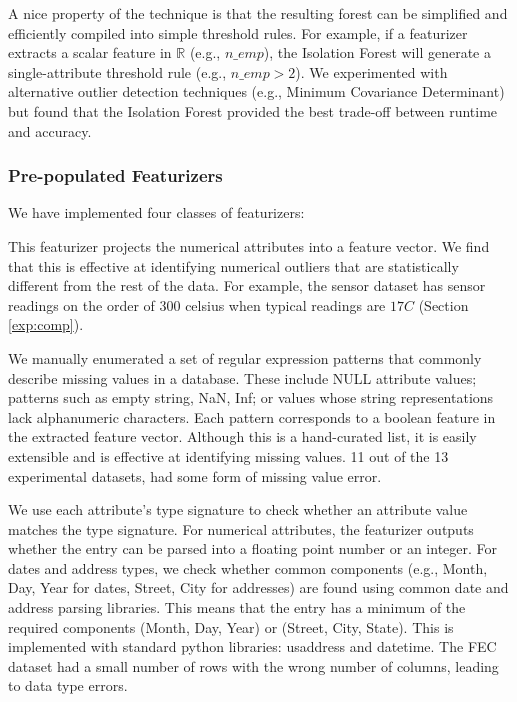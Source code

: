 A nice property of the technique is that the resulting forest can be simplified and efficiently compiled into simple threshold rules. 
For example, if a featurizer extracts a scalar feature in $\mathbb{R}$ (e.g., $n\_emp$), the Isolation Forest will generate a single-attribute threshold rule (e.g., $n\_emp > 2$).  
 We experimented with alternative outlier detection techniques (e.g., Minimum Covariance Determinant) but found that the Isolation Forest provided the best trade-off between runtime and accuracy.

\subsubsection{Pre-populated Featurizers}

We have implemented four classes of featurizers:


 This featurizer projects the numerical attributes into a feature vector.  We find that this is effective at identifying numerical outliers that are statistically different from the rest of the data. For example, the sensor dataset has sensor readings on the order of $300$ celsius when typical readings are $17C$ (Section \ref{exp:comp}).

  We manually enumerated a set of regular expression patterns that commonly describe missing values in a database.  These include \textsf{NULL} attribute values; patterns such as empty string, NaN, Inf; or values whose string representations lack alphanumeric characters. Each pattern corresponds to a boolean feature in the extracted feature vector.   Although this is a hand-curated list, it is easily extensible and is effective at identifying missing values. 11 out of the 13 experimental datasets, had some form of missing value error.

 We use each attribute's type signature to check whether an attribute value matches the type signature.  For numerical attributes, the featurizer outputs whether the entry can be parsed into a floating point number or an integer. For dates and address types, we check whether common components (e.g., Month, Day, Year for dates, Street, City for addresses) are found using common date and address parsing libraries.   This means that the entry has a minimum of the required components (Month, Day, Year) or (Street, City, State).  This is implemented with standard python libraries: \textsf{usaddress} and \textsf{datetime}. The FEC dataset had a small number of rows with the wrong number of columns, leading to data type errors.

